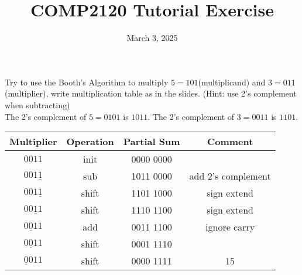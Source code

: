 \documentclass{exam}
\title{COMP2120 Tutorial Exercise}
\date{March 3, 2025}
\begin{document}
\maketitle

Try to use the Booth's Algorithm to multiply $5=101$(multiplicand) and $3=011$(multiplier),
write multiplication table as in the slides. (Hint: use 2's complement when subtracting) \\


The 2's complement of $5=0101$ is $1011$.
The 2's complement of $3=0011$ is $1101$.

\begin{table}[!ht]
    \centering
    \begin{tabular}{|c|c|c|c|}
        \hline
        Multiplier         & Operation & Partial Sum & Comment            \\ \hline
        $0011$             & init      & 0000 0000   & ~                  \\
        $001\underline{1}$ & sub       & 1011 0000   & add 2's complement \\
        $001\underline{1}$ & shift     & 1101 1000   & sign extend        \\
        $00\underline{1}1$ & shift     & 1110 1100   & sign extend        \\
        $0\underline{0}11$ & add       & 0011 1100   & ignore carry       \\
        $0\underline{0}11$ & shift     & 0001 1110   & ~                  \\
        $\underline{0}011$ & shift     & 0000 1111   & 15                 \\
        \hline
    \end{tabular}
\end{table}
\end{document}
